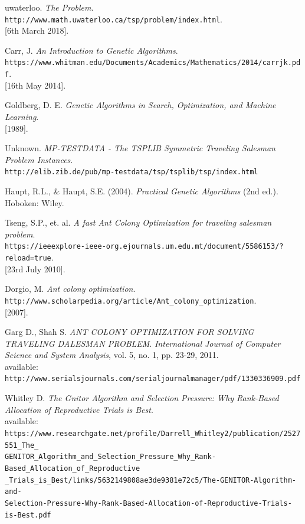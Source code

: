 \documentclass[11pt,a4paper,final]{article}
\begin{document}
	\begin{thebibliography}{9}
		uwaterloo.
		\textit{The Problem}.
		\\\texttt{http://www.math.uwaterloo.ca/tsp/problem/index.html}.
		\\{[6th March 2018]}.
		
		Carr, J.
		\textit{An Introduction to Genetic Algorithms}.
		\\\texttt{https://www.whitman.edu/Documents/Academics/Mathematics/2014/carrjk.pdf}.
		\\{[16th May 2014]}.
		
		Goldberg, D. E.
		\textit{Genetic Algorithms in Search, Optimization, and Machine
			Learning}.
		\\{[1989]}.
		
		Unknown.
		\textit{MP-TESTDATA - The TSPLIB Symmetric Traveling Salesman Problem Instances}.
		\\\texttt{http://elib.zib.de/pub/mp-testdata/tsp/tsplib/tsp/index.html}
		
		Haupt, R.L., \& Haupt, S.E. (2004).
		\textit{Practical Genetic Algorithms} (2nd ed.). Hoboken: Wiley.
		
		Tseng, S.P., et. al.
		\textit{A fast Ant Colony Optimization for traveling salesman problem}.
		\\\texttt{https://ieeexplore-ieee-org.ejournals.um.edu.mt/document/5586153/?reload=true}.
		\\{[23rd July 2010]}.
		
		Dorgio, M.
		\textit{Ant colony optimization}.
		\\\texttt{http://www.scholarpedia.org/article/Ant\_colony\_optimization}.
		\\{[2007]}.
		
		Garg D., Shah S.
		\textit{ANT COLONY OPTIMIZATION FOR SOLVING TRAVELING DALESMAN PROBLEM}.
		\textit{International Journal of Computer Science and System Analysis}, vol. 5, no. 1, pp. 23-29, 2011.\\
		available: \texttt{http://www.serialsjournals.com/serialjournalmanager/pdf/1330336909.pdf}
		
		Whitley D.
		\textit{The Gnitor Algorithm and Selection Pressure: Why Rank-Based Allocation of Reproductive Trials is Best}.\\
		available:\\ \texttt{https://www.researchgate.net/profile/Darrell\_Whitley2/publication/2527551\_The\_}\\\texttt{GENITOR\_Algorithm\_and\_Selection\_Pressure\_Why\_Rank-Based\_Allocation\_of\_Reproductive}\\\texttt{\_Trials\_is\_Best/links/5632149808ae3de9381e72c5/The-GENITOR-Algorithm-and-}\\\texttt{Selection-Pressure-Why-Rank-Based-Allocation-of-Reproductive-Trials-is-Best.pdf}
		

\end{thebibliography}
\end{document}
